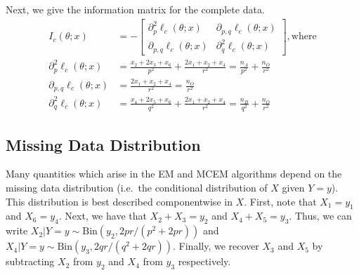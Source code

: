 \documentclass[11pt, oneside]{article}   	%
\begin{document}
\begin{appendices}
    Next, we give the information matrix for the complete data.
    \begin{align}
        I_c(\theta;x) &= - \begin{bmatrix}
            \partial^2_p \ell_c(\theta; x) & \partial_{p,q} \ell_c(\theta; x)\\
            \partial_{p,q} \ell_c(\theta; x) & \partial^2_q \ell_c(\theta; x)
        \end{bmatrix} \mathrm{, where}\\
        \partial^2_p \ell_c(\theta; x) &=  \frac{x_2 + 2 x_3 + x_6}{p^2} + \frac{2x_1 + x_2 + x_4}{r^2} = \frac{n_A}{p^2} + \frac{n_O}{r^2}\\
        \partial_{p,q} \ell_c(\theta; x) &=   \frac{2x_1 + x_2 + x_4}{r^2} = \frac{n_O}{r^2}\\
        \partial^2_q \ell_c(\theta; x) &=  \frac{x_4 + 2 x_5 + x_6}{q^2} + \frac{2x_1 + x_2 + x_4}{r^2} = \frac{n_B}{q^2} + \frac{n_O}{r^2}
    \end{align}
    

    \subsection{Missing Data Distribution}
    \label{app:blood_miss}

    Many quantities which arise in the EM and MCEM algorithms depend on the missing data distribution (i.e.\ the conditional distribution of $X$ given $Y=y$). This distribution is best described componentwise in $X$. First, note that $X_1 = y_1$ and $X_6 = y_4$. Next, we have that $X_2 + X_3 = y_2$ and $X_4 + X_5 = y_3$. Thus, we can write $X_2 |Y=y \sim \mathrm{Bin}(y_2, 2pr / (p^2 + 2pr))$ and $X_4 |Y=y \sim \mathrm{Bin}(y_3, 2qr / (q^2 + 2qr))$. Finally, we recover $X_3$ and $X_5$ by subtracting $X_2$ from $y_2$ and $X_4$ from $y_3$ respectively.


\end{appendices}
\end{document}
